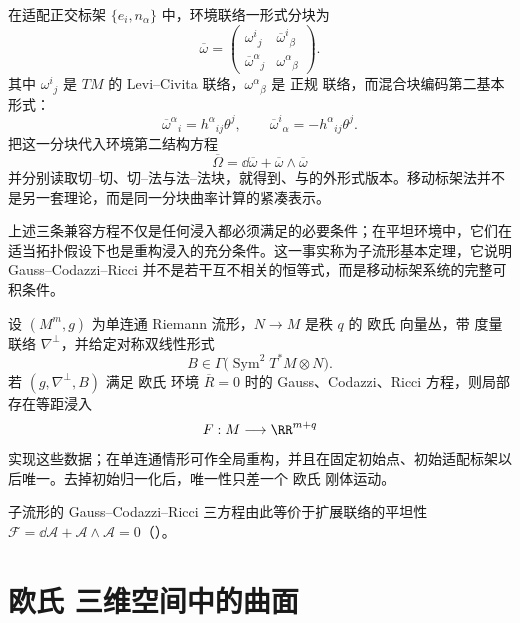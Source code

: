 在适配正交标架 $\{e_i,n_\alpha\}$ 中，环境联络一形式分块为
\[
\overline\omega
=
\begin{pmatrix}
\omega^i{}_j & \overline\omega^i{}_\beta\\
\overline\omega^\alpha{}_j & \omega^\alpha{}_\beta
\end{pmatrix}.
\]
其中 $\omega^i{}_j$ 是 $TM$ 的 Levi--Civita 联络，$\omega^\alpha{}_\beta$ 是 正规 联络，而混合块编码第二基本形式：
\begin{equation}\label{eq:math-dg-moving-frame-second-form}
\overline\omega^\alpha{}_i
=h^\alpha{}_{ij}\theta^j,
\qquad
\overline\omega^i{}_\alpha
=-h^\alpha{}_{ij}\theta^j.
\end{equation}
把这一分块代入环境第二结构方程
\[
\overline\Omega
=\dd\overline\omega+\overline\omega\wedge\overline\omega
\]
并分别读取切--切、切--法与法--法块，就得到、与的外形式版本。移动标架法并不是另一套理论，而是同一分块曲率计算的紧凑表示。

上述三条兼容方程不仅是任何浸入都必须满足的必要条件；在平坦环境中，它们在适当拓扑假设下也是重构浸入的充分条件。这一事实称为子流形基本定理，它说明 Gauss--Codazzi--Ricci 并不是若干互不相关的恒等式，而是移动标架系统的完整可积条件。

设 $(M^m,g)$ 为单连通 Riemann 流形，$N\to M$ 是秩 $q$ 的 欧氏 向量丛，带 度量 联络 $\nabla^\perp$，并给定对称双线性形式
\[
B\in\Gamma\bigl(\operatorname{Sym}^2T^*M\otimes N\bigr).
\]
若 $(g,\nabla^\perp,B)$ 满足 欧氏 环境 $\overline R=0$ 时的 Gauss、Codazzi、Ricci 方程，则局部存在等距浸入
\[
F:M\longrightarrow\RR^{m+q}
\]
实现这些数据；在单连通情形可作全局重构，并且在固定初始点、初始适配标架以后唯一。去掉初始归一化后，唯一性只差一个 欧氏 刚体运动。

子流形的 Gauss--Codazzi--Ricci 三方程由此等价于扩展联络的平坦性 $\mathcal F=\dd\mathcal A+\mathcal A\wedge\mathcal A=0$（）。

\section{欧氏 三维空间中的曲面}

